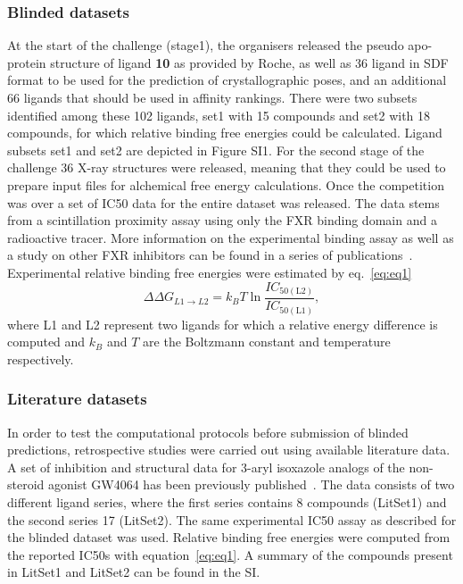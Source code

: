 \documentclass{svjour3}                     %
\begin{document}
\subsubsection{Blinded datasets}
At the start of the challenge (stage1), the organisers released the pseudo apo-protein structure of ligand \textbf{10} as provided by Roche, as well as 36 ligand in SDF format to be used for the prediction of crystallographic poses, and an additional 66 ligands that should be used in affinity rankings. There were two subsets identified among these 102 ligands, set1 with 15 compounds and set2 with 18 compounds, for which relative binding free energies could be calculated. Ligand subsets set1 and set2 are depicted in Figure SI1. For the second stage of the challenge 36 X-ray structures were released, meaning that they could be used to prepare input files for alchemical free energy calculations.  Once the competition was over a set of IC50 data for the entire dataset was released. The data stems from a scintillation proximity assay using only the FXR binding domain and a radioactive tracer. More information on the experimental binding assay as well as a study on other FXR inhibitors can be found in a series of publications~\cite{NicholsParksConslerEtAl1998,FengYangZhangEtAl2009,RichterBensonBlumEtAl2011,RichterBensonBleicherEtAl2011}. Experimental relative binding free energies were estimated by eq.~\ref{eq:eq1}
\begin{equation}
\Delta \Delta G_{L1\rightarrow L2} = k_BT\ln\frac{IC_{50\mathrm{(L2)}}}{IC_{50\mathrm{(L1)}}}, 
\label{eq:eq1}
\end{equation}
where L1 and L2 represent two ligands for which a relative energy difference is computed and $k_B$ and $T$ are the Boltzmann constant and temperature respectively. 

\subsubsection{Literature datasets}

In order to test the computational protocols before submission of blinded predictions, retrospective studies were carried out using available literature data. A set of inhibition and structural data for 3-aryl isoxazole analogs of the non-steroid agonist GW4064 has been previously published~\cite{FengYangZhangEtAl2009,RichterBensonBleicherEtAl2011}. The data consists of two different ligand  series, where the first series contains 8 compounds (LitSet1) and the second series 17 (LitSet2). The same experimental IC50 assay as described for the blinded dataset was used. Relative binding free energies were computed from the reported IC50s with equation~\ref{eq:eq1}. A summary of the compounds present in LitSet1 and LitSet2 can be found in the SI.
\end{document}
